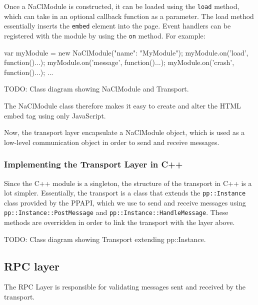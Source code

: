 Once a NaClModule is constructed, it can be loaded using the \lstinline{load} method, which can take in an optional callback function as a parameter. The load method essentially inserts the \lstinline{embed} element into the page. Event handlers can be registered with the module by using the \lstinline{on} method. For example:

\begin{code}
var myModule = new NaClModule({"name": "MyModule"});
myModule.on('load', function(){...});
myModule.on('message', function(){...});
myModule.on('crash', function(){...});
...
\end{code}

TODO: Class diagram showing NaClModule and Transport.

The NaClModule class therefore makes it easy to create and alter the HTML embed tag using only JavaScript. 

Now, the transport layer encapsulate a NaClModule object, which is used as a low-level communication object in order to send and receive messages. 

\subsubsection{Implementing the Transport Layer in C++} %
\label{ssub:implementing_the_transport_layer_in_cpp_}
Since the C++ module is a singleton, the structure of the transport in C++ is a lot simpler. Essentially, the transport is a class that extends the \lstinline{pp::Instance} class provided by the PPAPI, which we use to send and receive messages using \lstinline{pp::Instance::PostMessage} and \lstinline{pp::Instance::HandleMessage}. These methods are overridden in order to link the transport with the layer above.

TODO: Class diagram showing Transport extending pp::Instance.




\subsection{RPC layer} %
\label{sub:json_rpc_layer_design}
The RPC Layer is responsible for validating messages sent and received by the transport. 

